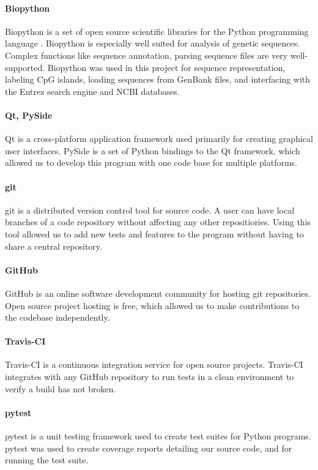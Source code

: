 \documentclass{bioinfo}
\begin{document}
\paragraph{Biopython\textcolon}
Biopython is a set of open source scientific libraries for the Python
programming language \citep{pmid19304878}. Biopython is especially
well suited for analysis of genetic sequences. Complex functions like
sequence annotation, parsing sequence files are very
well-supported. Biopython was used in this project for sequence
representation, labeling CpG islands, loading sequences from GenBank
files, and interfacing with the Entrez search engine and NCBI databases.
    
\paragraph{Qt, PySide\textcolon}
Qt is a cross-platform application framework used primarily for
creating graphical user interfaces. PySide is a set of Python bindings
to the Qt framework, which allowed us to develop this program with one
code base for multiple platforms.

\paragraph{git\textcolon} 
git is a distributed version control tool for source code. A user can
have local branches of a code repository without affecting any other
repositiories. Using this tool allowed us to add new tests and
features to the program without having to share a central repository.

\paragraph{GitHub\textcolon} 
GitHub is an online software development community for hosting git
repositories. Open source project hosting is free, which allowed us to
make contributions to the codebase independently.
    
\paragraph{Travis-CI\textcolon}
Travis-CI is a continuous integration service for open source
projects. Travis-CI integrates with any GitHub repository to run tests
in a clean environment to verify a build has not broken.

\paragraph{pytest\textcolon} 
pytest is a unit testing framework used to create test suites for
Python programs. pytest was used to create coverage reports detailing
our source code, and for running the test suite.
\end{document}
